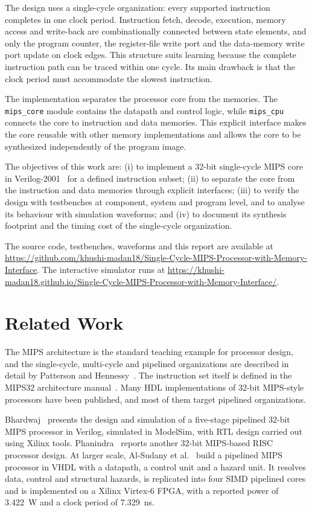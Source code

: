 \documentclass[conference]{IEEEtran}
\newcommand{\repo}{https://github.com/khushi-madan18/Single-Cycle-MIPS-Processor-with-Memory-Interface}
\newcommand{\live}{https://khushi-madan18.github.io/Single-Cycle-MIPS-Processor-with-Memory-Interface/}
\begin{document}
The design uses a single-cycle organization: every supported instruction completes in one clock period. Instruction fetch, decode, execution, memory access and write-back are combinationally connected between state elements, and only the program counter, the register-file write port and the data-memory write port update on clock edges. This structure suits learning because the complete instruction path can be traced within one cycle. Its main drawback is that the clock period must accommodate the slowest instruction.

The implementation separates the processor core from the memories. The \texttt{mips\_core} module contains the datapath and control logic, while \texttt{mips\_cpu} connects the core to instruction and data memories. This explicit interface makes the core reusable with other memory implementations and allows the core to be synthesized independently of the program image.

The objectives of this work are: (i) to implement a 32-bit single-cycle MIPS core in Verilog-2001~\cite{verilog} for a defined instruction subset; (ii) to separate the core from the instruction and data memories through explicit interfaces; (iii) to verify the design with testbenches at component, system and program level, and to analyse its behaviour with simulation waveforms; and (iv) to document its synthesis footprint and the timing cost of the single-cycle organization.

The source code, testbenches, waveforms and this report are available at \url{\repo}. The interactive simulator runs at \url{\live}.

\section{Related Work}
The MIPS architecture is the standard teaching example for processor design, and the single-cycle, multi-cycle and pipelined organizations are described in detail by Patterson and Hennessy~\cite{patterson}. The instruction set itself is defined in the MIPS32 architecture manual~\cite{mips32}. Many HDL implementations of 32-bit MIPS-style processors have been published, and most of them target pipelined organizations.

Bhardwaj~\cite{bhardwaj} presents the design and simulation of a five-stage pipelined 32-bit MIPS processor in Verilog, simulated in ModelSim, with RTL design carried out using Xilinx tools. Phanindra~\cite{phanindra} reports another 32-bit MIPS-based RISC processor design. At larger scale, Al-Sudany et al.~\cite{alsudany} build a pipelined MIPS processor in VHDL with a datapath, a control unit and a hazard unit. It resolves data, control and structural hazards, is replicated into four SIMD pipelined cores and is implemented on a Xilinx Virtex-6 FPGA, with a reported power of 3.422~W and a clock period of 7.329~ns.
\end{document}
